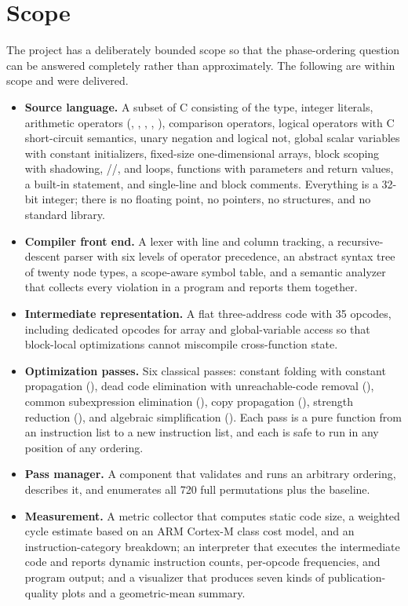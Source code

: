 \section{Scope}

The project has a deliberately bounded scope so that the phase-ordering question can be answered completely rather than approximately. The following are within scope and were delivered.

\begin{itemize}
  \item \textbf{Source language.} A subset of C consisting of the  type, integer literals, arithmetic operators (\code{+}, \code{-}, \code{*}, \code{/}, \code{\%}), comparison operators, logical operators with C short-circuit semantics, unary negation and logical not, global scalar variables with constant initializers, fixed-size one-dimensional arrays, block scoping with shadowing, //,  and  loops, functions with parameters and return values, a built-in  statement, and single-line and block comments. Everything is a 32-bit integer; there is no floating point, no pointers, no structures, and no standard library.
  \item \textbf{Compiler front end.} A lexer with line and column tracking, a recursive-descent parser with six levels of operator precedence, an abstract syntax tree of twenty node types, a scope-aware symbol table, and a semantic analyzer that collects every violation in a program and reports them together.
  \item \textbf{Intermediate representation.} A flat three-address code with 35 opcodes, including dedicated opcodes for array and global-variable access so that block-local optimizations cannot miscompile cross-function state.
  \item \textbf{Optimization passes.} Six classical passes: constant folding with constant propagation (), dead code elimination with unreachable-code removal (), common subexpression elimination (), copy propagation (), strength reduction (), and algebraic simplification (). Each pass is a pure function from an instruction list to a new instruction list, and each is safe to run in any position of any ordering.
  \item \textbf{Pass manager.} A component that validates and runs an arbitrary ordering, describes it, and enumerates all 720 full permutations plus the baseline.
  \item \textbf{Measurement.} A metric collector that computes static code size, a weighted cycle estimate based on an ARM Cortex-M class cost model, and an instruction-category breakdown; an interpreter that executes the intermediate code and reports dynamic instruction counts, per-opcode frequencies, and program output; and a visualizer that produces seven kinds of publication-quality plots and a geometric-mean summary.

\end{itemize}
